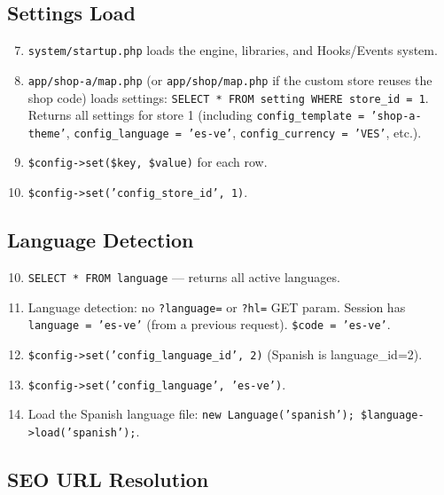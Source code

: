 \documentclass[11pt,a4paper]{article}
\begin{document}
\subsection{Settings Load}

\begin{enumerate}[leftmargin=1.6em,itemsep=2pt]
  \setcounter{enumi}{6}
  \item \texttt{system/startup.php} loads the engine, libraries, and
        Hooks/Events system.
  \item \texttt{app/shop-a/map.php} (or \texttt{app/shop/map.php} if
        the custom store reuses the shop code) loads settings:
        \texttt{SELECT * FROM setting WHERE store\_id = 1}. Returns
        all settings for store 1 (including
        \texttt{config\_template = 'shop-a-theme'},
        \texttt{config\_language = 'es-ve'},
        \texttt{config\_currency = 'VES'}, etc.).
  \item \texttt{\$config->set(\$key, \$value)} for each row.
  \item \texttt{\$config->set('config\_store\_id', 1)}.
\end{enumerate}

\subsection{Language Detection}

\begin{enumerate}[leftmargin=1.6em,itemsep=2pt]
  \setcounter{enumi}{9}
  \item \texttt{SELECT * FROM language} --- returns all active
        languages.
  \item Language detection: no \texttt{?language=} or \texttt{?hl=}
        GET param. Session has \texttt{language = 'es-ve'} (from a
        previous request). \texttt{\$code = 'es-ve'}.
  \item \texttt{\$config->set('config\_language\_id', 2)} (Spanish
        is language\_id=2).
  \item \texttt{\$config->set('config\_language', 'es-ve')}.
  \item Load the Spanish language file:
        \texttt{new Language('spanish');
        \$language->load('spanish');}.
\end{enumerate}

\subsection{SEO URL Resolution}
\end{document}
